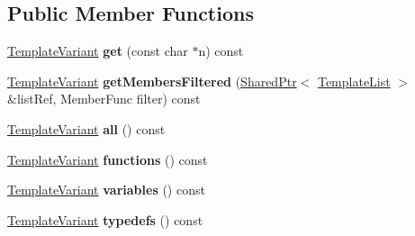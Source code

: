 \subsection*{Public Member Functions}
\begin{DoxyCompactItemize}
\item 
\mbox{\label{class_class_members_index_context_1_1_private_ae9321579a4405a12c94b0d8ce3391d24}} 
\mbox{\hyperlink{class_template_variant}{Template\+Variant}} {\bfseries get} (const char $\ast$n) const
\item 
\mbox{\label{class_class_members_index_context_1_1_private_a033a9a081f2a1c89f800040bb3f753c9}} 
\mbox{\hyperlink{class_template_variant}{Template\+Variant}} {\bfseries get\+Members\+Filtered} (\mbox{\hyperlink{class_shared_ptr}{Shared\+Ptr}}$<$ \mbox{\hyperlink{class_template_list}{Template\+List}} $>$ \&list\+Ref, Member\+Func filter) const
\item 
\mbox{\label{class_class_members_index_context_1_1_private_a757a20691c338e11779f3b7f5df821cb}} 
\mbox{\hyperlink{class_template_variant}{Template\+Variant}} {\bfseries all} () const
\item 
\mbox{\label{class_class_members_index_context_1_1_private_a90062e54b51481187d664b031cb4feb5}} 
\mbox{\hyperlink{class_template_variant}{Template\+Variant}} {\bfseries functions} () const
\item 
\mbox{\label{class_class_members_index_context_1_1_private_a03b47e3c18488600e7397ef279e9606d}} 
\mbox{\hyperlink{class_template_variant}{Template\+Variant}} {\bfseries variables} () const
\item 
\mbox{\label{class_class_members_index_context_1_1_private_a3c9d73d3b83502f30cca83e41dc9aea3}} 
\mbox{\hyperlink{class_template_variant}{Template\+Variant}} {\bfseries typedefs} () const
\item 
\mbox{\label{class_class_members_index_context_1_1_private_ad1adb4455afb6da6ee7e37b6d811b57b}} 

\end{DoxyCompactItemize}
